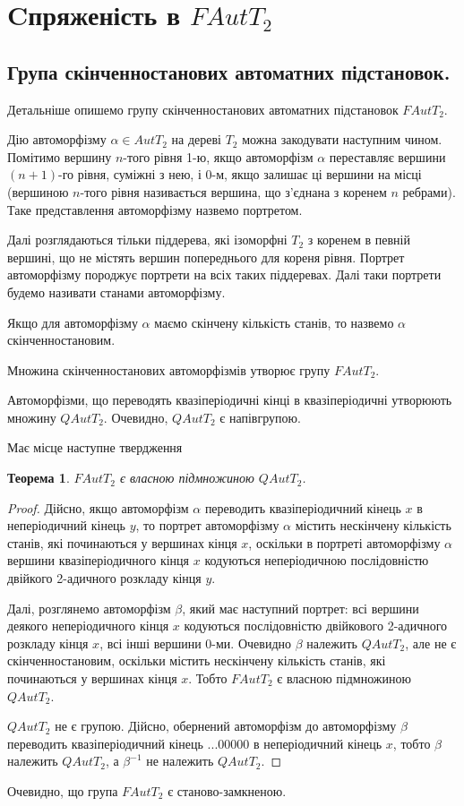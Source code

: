 \documentclass[a4paper,12pt]{article} \usepackage{a4wide}
\numberwithin{equation}{subsection}
\newtheorem{theorem}{Теорема}[subsection]
\begin{document}
\section{Cпряженість в
$FAutT_2$}
\subsection{Група скінченностанових автоматних підстановок. }


 Детальніше опишемо групу скінченностанових автоматних підстановок $FAutT_2$.

 Дію автоморфізму $\alpha\in AutT_2$ на
 дереві $T_2$ можна закодувати наступним чином. Помітимо вершину
 $n$-того рівня 1-ю, якщо автоморфізм $\alpha$ переставляє вершини $(n+1)$-го
 рівня, суміжні з нею, і 0-м, якщо залишає ці вершини  на
 місці (вершиною $n$-того рівня називається вершина, що з'єднана з коренем $n$ ребрами).
 Таке представлення автоморфізму назвемо портретом.


 Далі розглядаються тільки піддерева, які ізоморфні $T_2$ з коренем в певній
 вершині, що не містять вершин попереднього для кореня рівня.
 Портрет автоморфізму породжує портрети на всіх таких піддеревах.
 Далі таки портрети будемо називати станами автоморфізму.

 Якщо для автоморфізму $\alpha$ маємо скінчену кількість станів, то назвемо $\alpha$ скінченностановим.

  Множина скінченностанових автоморфізмів утворює групу $FAutT_2$.

  Автоморфізми, що переводять квазіперіодичні кінці в квазіперіодичні утворюють множину $QAutT_2$. Очевидно, $QAutT_2$
  є напівгрупою.

    Має місце наступне твердження
  \begin{theorem}$FAutT_2$ є
  власною підмножиною $QAutT_2$.
\end{theorem}
\begin{proof}
 Дійсно, якщо автоморфізм $\alpha$  переводить квазіперіодичний кінець $x$ в неперіодичний кінець $y$,
 то портрет автоморфізму $\alpha$ містить нескінчену кількість станів, які починаються у вершинах кінця $x$,
 оскільки в портреті автоморфізму $\alpha$ вершини квазіперіодичного кінця $x$ кодуються неперіодичною послідовністю
 двійкого 2-адичного розкладу кінця $y$.

  Далі, розглянемо автоморфізм $\beta$, який має наступний портрет: всі вершини деякого неперіодичного кінця $x$
 кодуються послідовністю двійкового 2-адичного розкладу кінця $x$, всі інші вершини 0-ми. Очевидно $\beta$
  належить $QAutT_2$, але не є
скінченностановим, оскільки
 містить нескінчену кількість станів, які починаються у вершинах кінця $x$. Тобто $FAutT_2$ є
  власною підмножиною $QAutT_2$.

   $QAutT_2$ не є групою. Дійсно, обернений автоморфізм до автоморфізму $\beta$ переводить квазіперіодичний
  кінець ...00000 в неперіодичний кінець $x$, тобто $\beta$ належить $QAutT_2$, а $\beta^{-1}$
   не належить $QAutT_2$.
\end{proof}
 Очевидно, що група $FAutT_2$ є станово-замкненою.
\end{document}
